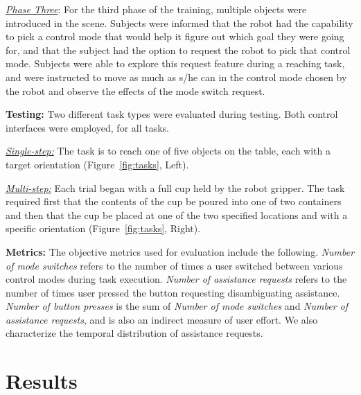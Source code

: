 \noindent\underline{\textit{Phase Three}}: For the third phase of the training, multiple objects were introduced in the scene. 
Subjects were informed that the robot had the capability to pick a control mode that would help it figure out which goal they were going for, and that the subject had the option to request the robot to pick that control mode. 
Subjects were able to explore this request feature during a reaching task, and were instructed to move as much as s/he can in the control mode chosen by the robot and observe the effects of the mode switch request. 

\noindent\textbf{Testing:} Two different task types were evaluated during testing. Both control interfaces were employed, for all tasks.

\noindent\underline{\textit{Single-step:}} The task is to reach one of five objects on the table, each with a target orientation (Figure~\ref{fig:tasks}, Left). 

\noindent\underline{\textit{Multi-step:}} Each trial began with a full cup held by the robot gripper. The task required first that the contents of the cup be poured into one of two containers and then that the cup be placed at one of the two specified locations and with a specific orientation (Figure~\ref{fig:tasks}, Right). 


\noindent\textbf{Metrics:}
The objective metrics used for evaluation include the following. \textit{Number of mode switches} refers to the number of times a user switched between various control modes during task execution. \textit{Number of assistance requests} refers to the number of times user pressed the button requesting disambiguating assistance. \textit{Number of button presses} is the sum of \textit{Number of mode switches} and \textit{Number of assistance requests}, and is also an indirect measure of user effort. We also characterize the temporal distribution of assistance requests.

%


\section{Results}\label{sec:results}



